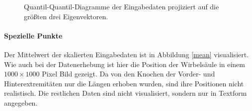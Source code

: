  \begin{figure}
  \qquad
  \qquad
  
  \caption{Quantil-Quantil-Diagramme der Eingabedaten projiziert auf die größten drei Eigenvektoren.}
  \label{qqdiagram_projections}
 \end{figure}
 
 
 \paragraph{Spezielle Punkte}
 Der Mittelwert der skalierten Eingabedaten ist in Abbildung \ref{mean} visualisiert.
 Wie auch bei der Datenerhebung ist hier die Position der Wirbelsäule in einem $1000 \times 1000$ Pixel Bild gezeigt. Da von den Knochen der Vorder- und Hinterextremitäten nur die Längen erhoben wurden, sind ihre Positionen nicht realistisch. Die restlichen Daten sind nicht visualisiert, sondern nur in Textform angegeben.
 
